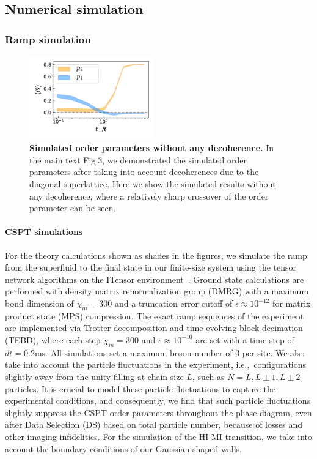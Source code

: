 \documentclass[preprint,superscriptaddress,floatfix, nofootinbib]{revtex4-2}
\begin{document}
\subsection*{Numerical simulation}

\subsubsection*{Ramp simulation}
\begin{figure}
    \centering
    \includegraphics[width=0.48\textwidth]{figures/Coupled_CSPT_OP_gnd_state_no_decoherence.pdf}
    \caption{\textbf{Simulated order parameters without any decoherence.} In the main text Fig.3, we demonstrated the simulated order parameters after taking into account decoherences due to the diagonal superlattice. Here we show the simulated results without any decoherence, where a relatively sharp crossover of the order parameter can be seen.
    }
    \label{fig: Coupled_CSPT_no_decoherence}
\end{figure}

\paragraph*{CSPT simulations} For the theory calculations shown as shades in the figures, we simulate the ramp from the superfluid to the final state in our finite-size system using the tensor network algorithms on the ITensor environment~\cite{itensor}. Ground state calculations are performed with density matrix renormalization group (DMRG) with a maximum bond dimension of $\chi_m=300$ and a truncation error cutoff of $\epsilon \approx 10^{-12}$ for matrix product state (MPS) compression. The exact ramp sequences of the experiment are implemented via Trotter decomposition and time-evolving block decimation (TEBD), where each step $\chi_m=300$ and $\epsilon \approx 10^{-10}$ are set with a time step of $dt=0.2$ms. All simulations set a maximum boson number of 3 per site. We also take into account the particle fluctuations in the experiment, i.e.,~configurations slightly away from the unity filling at chain size $L$, such as $N=L, L\pm1, L\pm2$ particles. It is crucial to model these particle fluctuations to capture the experimental conditions, and consequently, we find that such particle fluctuations slightly suppress the CSPT order parameters throughout the phase diagram, even after Data Selection (DS) based on total particle number, because of losses and other imaging infidelities. For the simulation of the HI-MI transition, we take into account the boundary conditions of our Gaussian-shaped walls.
\end{document}
